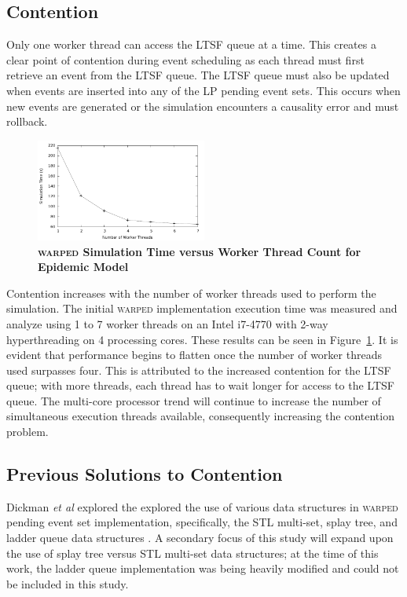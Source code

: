 \documentclass{sig-alternate}
\begin{document}
\subsection{Contention}

Only one worker thread can access the LTSF queue at a time.  This creates a clear point of
contention during event scheduling as each thread must first retrieve an event from the
LTSF queue.  The LTSF queue must also be updated when events are inserted into any of the
LP pending event sets.  This occurs when new events are generated or the simulation
encounters a causality error and must rollback.

\begin{figure}
    \centering
    \graphicspath{ {./figures/} }
    \includegraphics[width=0.5\textwidth,keepaspectratio]{notsx_profile}
    \caption{\textbf{\textsc{warped} Simulation Time versus Worker Thread Count for
        Epidemic Model}}\label{fig:notsx_profile}
\end{figure}

Contention increases with the number of worker threads used to perform the simulation.
The initial \textsc{warped} implementation execution time was measured and analyze using 1
to 7 worker threads on an Intel i7-4770 with 2-way hyperthreading on 4 processing cores.
These results can be seen in Figure~\ref{fig:notsx_profile}.  It is evident that
performance begins to flatten once the number of worker threads used surpasses four.  This
is attributed to the increased contention for the LTSF queue; with more threads, each
thread has to wait longer for access to the LTSF queue.  The multi-core processor trend
will continue to increase the number of simultaneous execution threads available,
consequently increasing the contention problem.

\subsection{Previous Solutions to Contention}

Dickman \emph{et al} explored the explored the use of various data structures in
\textsc{warped} pending event set implementation, specifically, the STL multi-set, splay
tree, and ladder queue data structures \cite{dickman}.  A secondary focus of this study
will expand upon the use of splay tree versus STL multi-set data structures; at the time
of this work, the ladder queue implementation was being heavily modified and could not be
included in this study.
\end{document}
